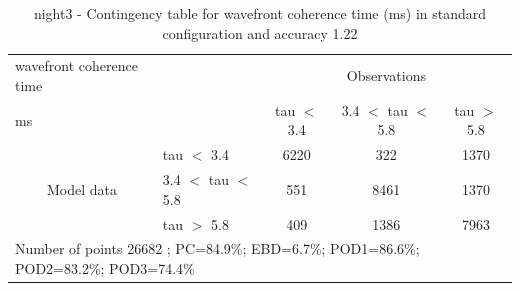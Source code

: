 \begin{table}[p!]
\begin{center}
\begin{tabular}{llccc}
\hline
{wavefront coherence time}                                       &                                                    & \multicolumn{3}{c}{Observations}                 \\
{ms}                                       &                             & tau $<$ 3.4   & 3.4 $<$ tau $<$ 5.8 & tau $>$ 5.8 \\
\hline
\multicolumn{1}{c}{\multirow{3}{*}{Model data}}  & tau $<$ 3.4             & 6220                & 322                       & 1370              \\
                                                 & 3.4  $<$ tau $<$ 5.8 & 551                & 8461                       & 1370              \\
                                                 & tau $>$ 5.8             & 409                & 1386                       & 7963              \\
\hline
\multicolumn{5}{l}{ Number of points        26682 ; PC=84.9\%; EBD=6.7\%; POD1=86.6\%; POD2=83.2\%; POD3=74.4\%}
\end{tabular}
\end{center}
\caption{night3 - Contingency table for  wavefront coherence time (ms) in standard configuration and accuracy 1.22}
\label{tab:contingencytauBEF:night3}
\end{table}
